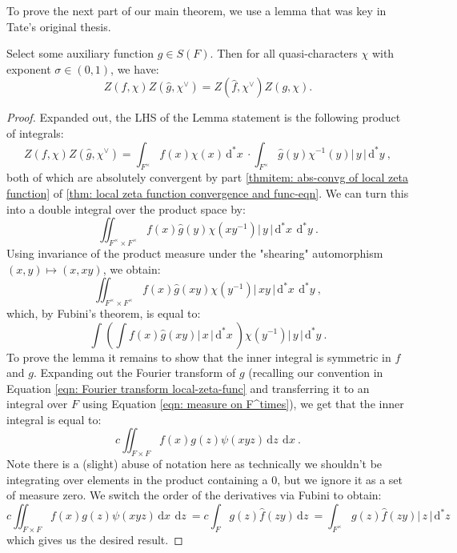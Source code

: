 \documentclass[11pt, x11names, openany]{book}
\renewcommand{\brack}[1]{\left(   #1 \right)}
\newcommand{\abs}[1]{\left| \, #1  \,\right|}
\renewcommand{\hat}{\widehat}
\newcommand{\inv}[1]{#1^{-1}}
\newcommand{\dx}{\, \mathrm{d}x \ }
\newcommand{\dz}{\, \mathrm{d}z \ }
\renewcommand{\d}[1]{\, \mathrm{d}#1 \ }
\begin{document}
To prove the next part of our main theorem, we use a lemma that was key in Tate's original thesis. 
\begin{lemma}
\label{lemma: local-zeta-func func eqn}
    Select some auxiliary function $g \in S(F)$. Then for all quasi-characters $\chi$ with exponent $\sigma \in (0, 1)$, we have:
    \begin{equation*}
        Z(f, \chi) Z(\hat{g}, \chi^\lor) = Z(\hat{f}, \chi^\lor)Z(g, \chi).
    \end{equation*}
\end{lemma}
\begin{proof}
Expanded out, the LHS of the Lemma statement is the following product of integrals:
\begin{equation*}
    Z(f, \chi) Z(\hat{g}, \chi^\lor) = \int_{F^\times} f(x) \chi(x) \d{^*x} \cdot \int_{F^\times} \hat{g}(y) \inv{\chi}(y) \abs{y} \d{^*y},
\end{equation*}
both of which are absolutely convergent by part \ref{thmitem: abs-convg of local zeta function} of \ref{thm: local zeta function convergence and func-eqn}. We can turn this into a double integral over the product space by:
\begin{equation*}
    \iint_{F^\times \times F^\times} f(x)\hat{g}(y) \chi(x \inv{y}) \abs{y} \d{^*x} \d{^*y}.
\end{equation*}
Using invariance of the product measure under the "shearing" automorphism $(x, y) \mapsto (x, xy)$, we obtain:
\begin{equation*}
    \iint_{F^\times \times F^\times} f(x)\hat{g}(xy)\chi(\inv{y}) \abs{xy} \d{^*x} \d{^*y},
\end{equation*}
which, by Fubini's theorem, is equal to:
\begin{equation*}
    \int \brack{\int f(x)\hat{g}(xy) \abs{x} \d{^*x}} \chi(\inv{y}) \abs{y} \d{^*y}.
\end{equation*}
To prove the lemma it remains to show that the inner integral is symmetric in $f$ and $g$. Expanding out the Fourier transform of $g$ (recalling our convention in Equation \ref{eqn: Fourier transform local-zeta-func} and transferring it to an integral over $F$ using Equation \ref{eqn: measure on F^times}), we get that the inner integral is equal to:
\begin{equation*}
    c \iint_{F \times F} f(x) g(z) \psi(xyz) \dz \dx.
\end{equation*}
Note there is a (slight) abuse of notation here as technically we shouldn't be integrating over elements in the product containing a 0, but we ignore it as a set of measure zero. We switch the order of the derivatives via Fubini to obtain:
\begin{equation*}
    c \iint_{F \times F} f(x) g(z) \psi(xyz) \dx \dz = c \int_F g(z) \hat{f}(zy) \dz = \int_{F^\times}  g(z) \hat{f}(zy) \abs{z} \d{^*z}
\end{equation*}
which gives us the desired result.
\end{proof}
\end{document}
